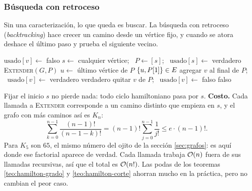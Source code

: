 \documentclass[11pt,letterpaper]{article}
\begin{document}
\subsubsection*{Búsqueda con retroceso}

Sin una caracterización, lo que queda es buscar. La búsqueda con
retroceso (\textit{backtracking}) hace crecer un camino desde un
vértice fijo, y cuando se atora deshace el último paso y prueba el
siguiente vecino.

\begin{algorithm}[H]
\caption{\textsc{Ciclo-Hamiltoniano}$(G)$: búsqueda con retroceso}
\label{alg:hamilton-retroceso}
\begin{algorithmic}[1]
    \State $\text{usado}[v] \gets$ falso
  \EndFor
  \State $s \gets$ cualquier vértice; \ $P \gets [s]$; \
         $\text{usado}[s] \gets$ verdadero
  \State \Return \textsc{Extender}$(G, P)$
\EndProcedure
\Statex
{}
  \State $u \gets$ último vértice de $P$
    \State \Return $\left\{ u, P[1] \right\} \in E$ 
  \EndIf
    \State agregar $v$ al final de $P$; \
           $\text{usado}[v] \gets$ verdadero
    \If{\textsc{Extender}$(G, P)$}
      \State \Return verdadero
    \EndIf
    \State quitar $v$ de $P$; \ $\text{usado}[v] \gets$ falso
  \EndFor
  \State \Return falso
\EndProcedure
\end{algorithmic}
\end{algorithm}

Fijar el inicio $s$ no pierde nada: todo ciclo hamiltoniano pasa por
$s$. \textbf{Costo.} Cada llamada a \textsc{Extender} corresponde a un
camino distinto que empieza en $s$, y el grafo con más caminos así es
$K_n$:
\[
  \sum_{k=0}^{n-1} \frac{(n-1)!}{(n-1-k)!}
  = (n-1)! \sum_{j=0}^{n-1} \frac{1}{j!} \le e \cdot (n-1)! .
\]
Para $K_5$ son $65$, el mismo número del ojito de la sección
\ref{sec:grafos}: es aquí donde ese factorial aparece de verdad. Cada
llamada trabaja $\mathcal{O}\!\left(n\right)$ fuera de sus llamadas recursivas, así que el
total es $\mathcal{O}\!\left(n!\right)$. Las podas de los teoremas
\ref{teo:hamilton-grado} y \ref{teo:hamilton-corte} ahorran mucho en
la práctica, pero no cambian el peor caso.
\end{document}
